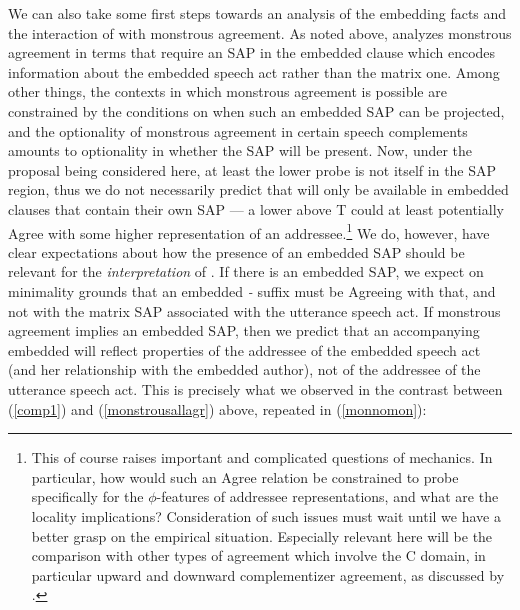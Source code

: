 \documentclass[output=paper, modfonts, nonflat]{langsci/langscibook}
\begin{document}
We can also take some first steps towards an analysis of the embedding
facts and the interaction of \allagr{} with monstrous agreement. As
noted above, \citet{sundaresan:diss} analyzes monstrous agreement in
terms that require an SAP in the embedded clause which encodes
information about the embedded speech act rather than the matrix
one. Among other things, the contexts in which monstrous agreement is
possible are constrained by the conditions on when such an embedded
SAP can be projected, and the optionality of monstrous agreement in
certain speech complements amounts to optionality in whether the SAP
will be present. Now, under the proposal being considered here, at
least the lower \allagr{} probe is not itself in the SAP region, thus
we do not necessarily predict that \allagr{} will only be available in
embedded clauses that contain their own SAP --- a lower \allagr{}
above T could at least potentially Agree with some higher
representation of an addressee.\footnote{This of course raises
  important and complicated questions of mechanics. In particular, how
  would such an Agree relation be constrained to probe specifically
  for the $\phi$-features of addressee representations, and what are
  the locality implications? Consideration of such issues must wait
  until we have a better grasp on the empirical situation. Especially relevant here will be the comparison with other types of agreement which involve the C domain, in particular upward and downward complementizer agreement, as discussed by .} We do,
however, have clear expectations about how the presence of an embedded
SAP should be relevant for the \emph{interpretation} of \allagr. If
there is an embedded SAP, we expect on minimality grounds that an
embedded \textit{-\nga} suffix must be Agreeing with that, and not
with the matrix SAP associated with the utterance speech act. If
monstrous agreement implies an embedded SAP, then we predict that an
accompanying embedded \allagr{} will reflect properties of the
addressee of the embedded speech act (and her relationship with the
embedded author), not of the addressee of the utterance speech
act. This is precisely what we observed in the contrast between
(\ref{comp1}) and (\ref{monstrousallagr}) above, repeated in
(\ref{monnomon}):
\end{document}
